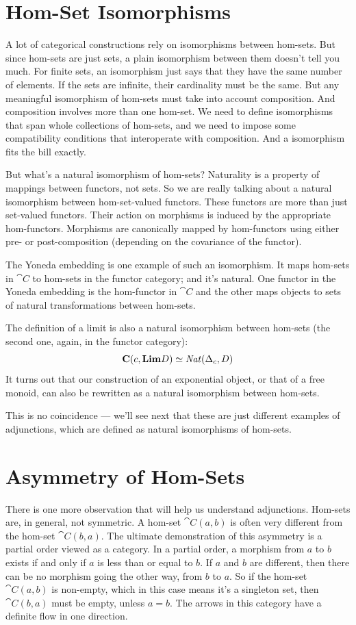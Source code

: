 \section{Hom-Set Isomorphisms}

A lot of categorical constructions rely on isomorphisms between
hom-sets. But since hom-sets are just sets, a plain isomorphism between
them doesn't tell you much. For finite sets, an isomorphism just says
that they have the same number of elements. If the sets are infinite,
their cardinality must be the same. But any meaningful isomorphism of
hom-sets must take into account composition. And composition involves
more than one hom-set. We need to define isomorphisms that span whole
collections of hom-sets, and we need to impose some compatibility
conditions that interoperate with composition. And a 
isomorphism fits the bill exactly.

But what's a natural isomorphism of hom-sets? Naturality is a property
of mappings between functors, not sets. So we are really talking about a
natural isomorphism between hom-set-valued functors. These functors are
more than just set-valued functors. Their action on morphisms is induced
by the appropriate hom-functors. Morphisms are canonically mapped by
hom-functors using either pre- or post-composition (depending on the
covariance of the functor).

The Yoneda embedding is one example of such an isomorphism. It maps
hom-sets in $\cat{C}$ to hom-sets in the functor category; and it's
natural. One functor in the Yoneda embedding is the hom-functor in
$\cat{C}$ and the other maps objects to sets of natural transformations
between hom-sets.

The definition of a limit is also a natural isomorphism between hom-sets
(the second one, again, in the functor category):
\[\cat{C}(c, \Lim[D]) \simeq \mathit{Nat}(\Delta_c, D)\]
It turns out that our construction of an exponential object, or that of
a free monoid, can also be rewritten as a natural isomorphism between
hom-sets.

This is no coincidence --- we'll see next that these are just different
examples of adjunctions, which are defined as natural isomorphisms of
hom-sets.

\section{Asymmetry of Hom-Sets}

There is one more observation that will help us understand adjunctions.
Hom-sets are, in general, not symmetric. A hom-set $\cat{C}(a, b)$ is
often very different from the hom-set $\cat{C}(b, a)$. The ultimate
demonstration of this asymmetry is a partial order viewed as a category.
In a partial order, a morphism from $a$ to $b$ exists if
and only if $a$ is less than or equal to $b$. If
$a$ and $b$ are different, then there can be no morphism
going the other way, from $b$ to $a$. So if the hom-set
$\cat{C}(a, b)$ is non-empty, which in this case means it's a
singleton set, then $\cat{C}(b, a)$ must be empty, unless
$a = b$. The arrows in this category have a definite flow in
one direction.

